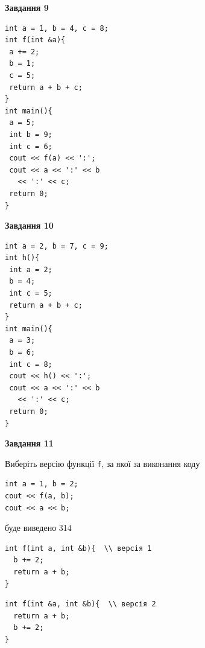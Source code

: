 \documentclass[12pt, ukrainian]{article}
\def\code#1{\Verb!#1!}
\begin{document}
{\begin {large}
\begin{minipage}[t]{11.0cm}
\end{minipage}


\begin{minipage}[t]{7.0cm}

\begin{center}
\textbf{Завдання 9}
\end{center}
\vspace{-8mm}

\begin{verbatim}
int a = 1, b = 4, c = 8;
int f(int &a){
 a += 2;
 b = 1;
 c = 5;
 return a + b + c;
}
int main(){
 a = 5;
 int b = 9;
 int c = 6;
 cout << f(a) << ':';
 cout << a << ':' << b 
   << ':' << c;
 return 0;
}
\end{verbatim}



\begin{center}
\textbf{Завдання 10}
\end{center}
\vspace{-8mm}

\begin{verbatim}
int a = 2, b = 7, c = 9;
int h(){
 int a = 2;
 b = 4;
 int c = 5;
 return a + b + c;
}
int main(){
 a = 3;
 b = 6;
 int c = 8;
 cout << h() << ':';
 cout << a << ':' << b 
   << ':' << c;
 return 0;
}
\end{verbatim}

\end{minipage}
\vline \hspace{1mm}
\begin{minipage}[t]{11.0cm}

\begin{center}
\textbf{Завдання 11}
\end{center}
Виберіть версію функції \code{f}, за якої за виконання коду
\begin{verbatim}
int a = 1, b = 2;
cout << f(a, b);
cout << a << b;
\end{verbatim}

буде виведено 314

\begin{verbatim}
int f(int a, int &b){  \\ версія 1
  b += 2;
  return a + b;
}
\end{verbatim}

\vspace{-8mm}\begin{verbatim}
int f(int &a, int &b){  \\ версія 2
  return a + b;
  b += 2;
}
\end{verbatim}


\end{minipage}
\end{large}}
\end{document}
